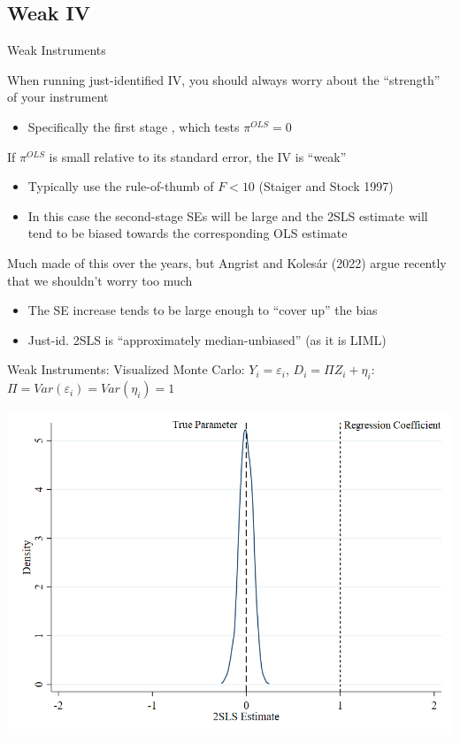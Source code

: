 \documentclass{beamer}
\begin{document}
\subsection{Weak IV}
\begin{frame}{Weak Instruments}

When running just-identified IV, you should always worry about the ``strength'' of your instrument
\begin{itemize}
  \item Specifically the first stage , which tests $\pi^{OLS}=0$ 
\end{itemize}
\smallskip\pause

If $\pi^{OLS}$ is small relative to its standard error, the IV is ``weak''
\begin{itemize}
  \item Typically use the rule-of-thumb of $F<10$ (Staiger and Stock 1997)
  \item In this case the second-stage SEs will be large and the 2SLS estimate will tend to be biased towards the corresponding OLS estimate
\end{itemize}\pause

Much made of this over the years, but Angrist and Koles\'{a}r (2022) argue recently that we shouldn't worry too much
\begin{itemize}
  \item The SE increase tends to be large enough to ``cover up'' the bias
  \item Just-id. 2SLS is ``approximately median-unbiased'' (as it is LIML)
\end{itemize}

\end{frame}

\begin{frame}{Weak Instruments: Visualized}
Monte Carlo: $Y_i=\varepsilon_i$, $D_i=\Pi Z_i+\eta_i$: $\Pi=Var(\varepsilon_i)=Var(\eta_i)=1$
\begin{center}
\includegraphics[scale=0.45]{./lecture_includes/strongpi.png}
\end{center}

\end{frame}
\end{document}

